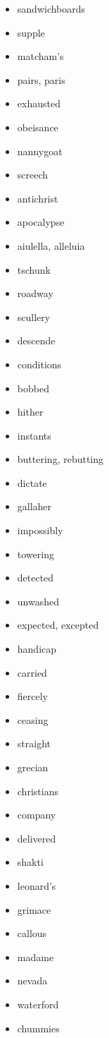\documentclass{article}
\begin{document}
\begin{itemize}
    \item sandwichboards
    \item supple
    \item matcham's
    \item pairs, paris
    \item exhausted
    \item obeisance
    \item nannygoat
    \item screech
    \item antichrist
    \item apocalypse
    \item aiulella, alleluia
    \item tschunk
    \item roadway
    \item scullery
    \item descende
    \item conditions
    \item bobbed
    \item hither
    \item instants
    \item buttering, rebutting
    \item dictate
    \item gallaher
    \item impossibly
    \item towering
    \item detected
    \item unwashed
    \item expected, excepted
    \item handicap
    \item carried
    \item fiercely
    \item ceasing
    \item straight
    \item grecian
    \item christians
    \item company
    \item delivered
    \item shakti
    \item leonard's
    \item grimace
    \item callous
    \item madame
    \item nevada
    \item waterford
    \item chummies

\end{itemize}
\end{document}
